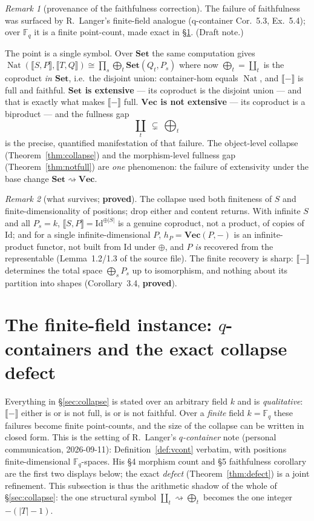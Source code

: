 \documentclass[11pt]{article}
\theoremstyle{plain}
\theoremstyle{definition}
\theoremstyle{remark}
\newtheorem{remark}{Remark}
\newcommand{\Set}{\mathbf{Set}}
\newcommand{\Vect}{\mathbf{Vec}}
\newcommand{\ext}[1]{\llbracket #1 \rrbracket}
\DeclareMathOperator{\Nat}{Nat}
\begin{document}
\begin{remark}[provenance of the faithfulness correction]
The failure of faithfulness was surfaced by R.\ Langer's finite-field analogue (q-container
Cor.~5.3, Ex.~5.4); over $\mathbb F_q$ it is a finite point-count, made exact in
\S\ref{sec:defect}. (Draft note.)
\end{remark}

The point is a single symbol. Over $\Set$ the same computation gives
$\Nat(\ext{S,P},\ext{T,Q})\cong\prod_s\bigoplus_t\Set(Q_t,P_s)$ where now $\bigoplus_t=\coprod_t$ is
the coproduct \emph{in $\Set$}, i.e.\ the disjoint union: container-hom equals $\Nat$, and $\ext{-}$
is full and faithful. \textbf{$\Set$ is extensive} --- its coproduct is the disjoint union --- and
that is exactly what makes $\ext{-}$ full. \textbf{$\Vect$ is not extensive} --- its coproduct is a
biproduct --- and the fullness gap
\[
   \coprod_t \ \subsetneq\ \bigoplus_t
\]
is the precise, quantified manifestation of that failure. The object-level collapse
(Theorem~\ref{thm:collapse}) and the morphism-level fullness gap (Theorem~\ref{thm:notfull}) are
\emph{one} phenomenon: the failure of extensivity under the base change $\Set\rightsquigarrow\Vect$.

\begin{remark}[what survives; \textbf{proved}]
The collapse used both finiteness of $S$ and finite-dimensionality of positions; drop either and
content returns. With infinite $S$ and all $P_s=k$, $\ext{S,P}=\mathrm{Id}^{\oplus|S|}$ is a genuine
coproduct, not a product, of copies of $\mathrm{Id}$; and for a single infinite-dimensional $P$,
$h_P=\Vect(P,-)$ is an infinite-product functor, not built from $\mathrm{Id}$ under $\oplus$, and $P$
\emph{is} recovered from the representable (Lemma~1.2/1.3 of the source file). The finite recovery is
sharp: $\ext{-}$ determines the total space $\bigoplus_s P_s$ up to isomorphism, and nothing about
its partition into shapes (Corollary~3.4, \textbf{proved}).
\end{remark}

\section{The finite-field instance: $q$-containers and the exact collapse defect}
\label{sec:defect}

Everything in \S\ref{sec:collapse} is stated over an arbitrary field $k$ and is \emph{qualitative}:
$\ext{-}$ either is or is not full, is or is not faithful. Over a \emph{finite} field
$k=\mathbb F_q$ these failures become finite point-counts, and the size of the collapse can be
written in closed form. This is the setting of R.\ Langer's \emph{$q$-container} note (personal
communication, 2026-09-11): Definition~\ref{def:vcont} verbatim, with positions
finite-dimensional $\mathbb F_q$-spaces. His \S4 morphism count and \S5 faithfulness corollary are
the first two displays below; the exact \emph{defect} (Theorem~\ref{thm:defect}) is a joint
refinement. This subsection is thus the arithmetic shadow of the whole of \S\ref{sec:collapse}:
the one structural symbol $\coprod_t\rightsquigarrow\bigoplus_t$ becomes the one integer
$-(|T|-1)$.
\end{document}

